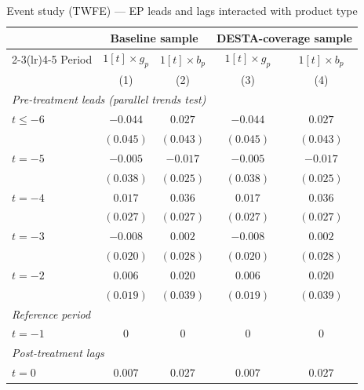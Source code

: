 \begin{table}[p]
\centering
\scriptsize
\setlength{\tabcolsep}{4pt}\renewcommand{\arraystretch}{0.92}
\caption{Event study (TWFE) --- EP leads and lags interacted with product type}
\label{tab:eventstudy_twfe}
\begin{threeparttable}
\begin{tabular}{lcccc}
\toprule
 & \multicolumn{2}{c}{Baseline sample} & \multicolumn{2}{c}{DESTA-coverage sample} \\
\cmidrule(lr){2-3}\cmidrule(lr){4-5}
Period & $1[t] \times g_p$ & $1[t] \times b_p$ & $1[t] \times g_p$ & $1[t] \times b_p$ \\
       & (1)             & (2)             & (3)             & (4)             \\
\midrule
\multicolumn{5}{l}{\textit{Pre-treatment leads (parallel trends test)}} \\[1pt]
$t\leq-6$ & $-0.044$        & $0.027$         & $-0.044$        & $0.027$         \\
       & $(0.045)$       & $(0.043)$       & $(0.045)$       & $(0.043)$       \\[1pt]
$t=-5$ & $-0.005$        & $-0.017$        & $-0.005$        & $-0.017$        \\
       & $(0.038)$       & $(0.025)$       & $(0.038)$       & $(0.025)$       \\[1pt]
$t=-4$ & $0.017$         & $0.036$         & $0.017$         & $0.036$         \\
       & $(0.027)$       & $(0.027)$       & $(0.027)$       & $(0.027)$       \\[1pt]
$t=-3$ & $-0.008$        & $0.002$         & $-0.008$        & $0.002$         \\
       & $(0.020)$       & $(0.028)$       & $(0.020)$       & $(0.028)$       \\[1pt]
$t=-2$ & $0.006$         & $0.020$         & $0.006$         & $0.020$         \\
       & $(0.019)$       & $(0.039)$       & $(0.019)$       & $(0.039)$       \\[1pt]
\midrule
\multicolumn{5}{l}{\textit{Reference period}} \\[1pt]
$t=-1$ & $0$             & $0$             & $0$             & $0$             \\[1pt]
\midrule
\multicolumn{5}{l}{\textit{Post-treatment lags}} \\[1pt]
$t=0$  & $0.007$         & $0.027$         & $0.007$         & $0.027$         \\

\end{tabular}
\end{threeparttable}
\end{table}
